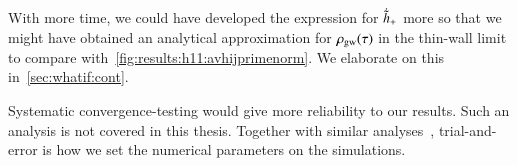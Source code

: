 With more time, we could have developed the expression for $\dot{\tilde{h}}_+$ more so that we might have obtained an analytical approximation for $\rho_\mathrm{gw}(\tau)$ in the thin-wall limit to compare with~\cref{fig:results:h11:avhijprimenorm}. We elaborate on this in~\cref{sec:whatif:cont}.


Systematic convergence-testing would give more reliability to our results. Such an analysis is not covered in this thesis. Together with similar analyses~\citep{christiansenAsimulationDomainFormation2024,christiansenAsevolutionRelativisticNbody2023}, trial-and-error is how we set the numerical parameters on the simulations. 


















